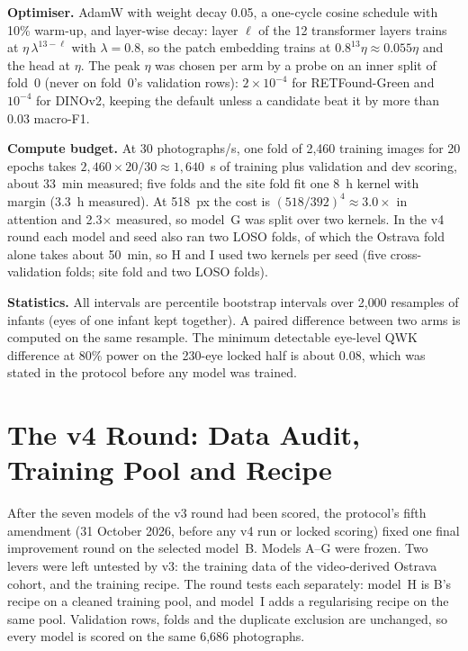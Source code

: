 \textbf{Optimiser.} AdamW with weight decay 0.05, a one-cycle cosine schedule with 10\% warm-up, and layer-wise decay: layer $\ell$ of the 12 transformer layers trains at $\eta\,\lambda^{13-\ell}$ with $\lambda=0.8$, so the patch embedding trains at $0.8^{13}\eta\approx0.055\eta$ and the head at $\eta$. The peak $\eta$ was chosen per arm by a probe on an inner split of fold~0 (never on fold~0's validation rows): $2\times10^{-4}$ for RETFound-Green and $10^{-4}$ for DINOv2, keeping the default unless a candidate beat it by more than 0.03 macro-F1.

\textbf{Compute budget.} At 30 photographs/s, one fold of 2{,}460 training images for 20 epochs takes $2{,}460\times20/30\approx1{,}640$~s of training plus validation and dev scoring, about 33~min measured; five folds and the site fold fit one 8~h kernel with margin (3.3~h measured). At 518~px the cost is $(518/392)^4\approx3.0\times$ in attention and 2.3$\times$ measured, so model~G was split over two kernels. In the v4 round each model and seed also ran two LOSO folds, of which the Ostrava fold alone takes about 50~min, so H and I used two kernels per seed (five cross-validation folds; site fold and two LOSO folds).

\textbf{Statistics.} All intervals are percentile bootstrap intervals over 2{,}000 resamples of infants (eyes of one infant kept together). A paired difference between two arms is computed on the same resample. The minimum detectable eye-level QWK difference at 80\% power on the 230-eye locked half is about 0.08, which was stated in the protocol before any model was trained.

\section{The v4 Round: Data Audit, Training Pool and Recipe}\label{sec:v4design}
After the seven models of the v3 round had been scored, the protocol's fifth amendment (31 October 2026, before any v4 run or locked scoring) fixed one final improvement round on the selected model~B. Models A--G were frozen. Two levers were left untested by v3: the training data of the video-derived Ostrava cohort, and the training recipe. The round tests each separately: model~H is B's recipe on a cleaned training pool, and model~I adds a regularising recipe on the same pool. Validation rows, folds and the duplicate exclusion are unchanged, so every model is scored on the same 6{,}686 photographs.


